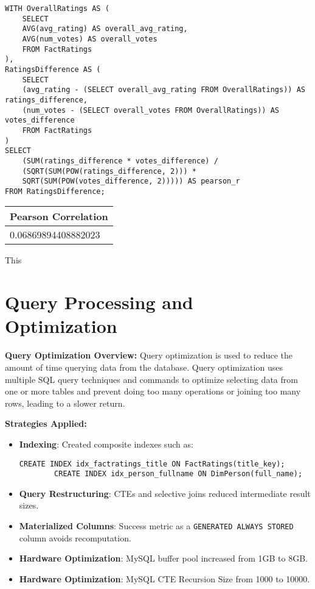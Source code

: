 \begin{lstlisting}[style=SQLStyle]
WITH OverallRatings AS (
	SELECT 
	AVG(avg_rating) AS overall_avg_rating,
	AVG(num_votes) AS overall_votes
	FROM FactRatings
),
RatingsDifference AS (
	SELECT 
	(avg_rating - (SELECT overall_avg_rating FROM OverallRatings)) AS ratings_difference,
	(num_votes - (SELECT overall_votes FROM OverallRatings)) AS votes_difference
	FROM FactRatings
)
SELECT 
	(SUM(ratings_difference * votes_difference) /
	(SQRT(SUM(POW(ratings_difference, 2))) *
	SQRT(SUM(POW(votes_difference, 2))))) AS pearson_r
FROM RatingsDifference;
\end{lstlisting}
\begin{center}
	\begin{tabular}{|p{8cm}|}
		\hline
		Pearson Correlation \\
		\hline
		0.06869894408882023 \\
		\hline
	\end{tabular}
\end{center}

This 


\section{Query Processing and Optimization}

\textbf{Query Optimization Overview:}  
Query optimization is used to reduce the amount of time querying data from the database. Query optimization uses multiple SQL query techniques and commands to optimize selecting data from one or more tables and prevent doing too many operations or joining too many rows, leading to a slower return. 

\textbf{Strategies Applied:}
\begin{itemize}
	\item \textbf{Indexing}: Created composite indexes such as:
	\begin{lstlisting}[style=SQLStyle]
		CREATE INDEX idx_factratings_title ON FactRatings(title_key);
		CREATE INDEX idx_person_fullname ON DimPerson(full_name);
	\end{lstlisting}
	\item \textbf{Query Restructuring}: CTEs and selective joins reduced intermediate result sizes.
	\item \textbf{Materialized Columns}: Success metric as a \texttt{GENERATED ALWAYS STORED} column avoids recomputation.
	\item \textbf{Hardware Optimization}: MySQL buffer pool increased from 1GB to 8GB.
	\item \textbf{Hardware Optimization}: MySQL CTE Recursion Size from 1000 to 10000.
\end{itemize}

